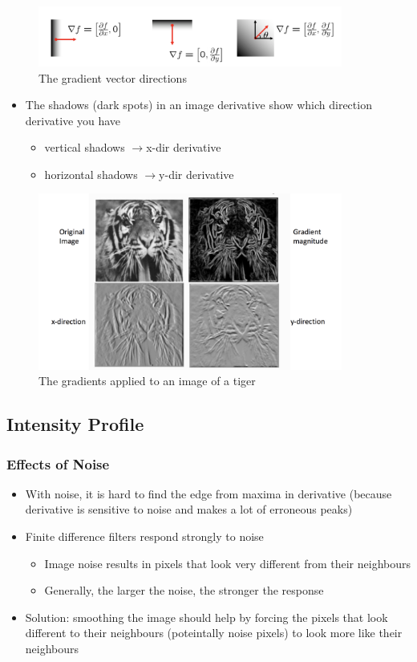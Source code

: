 \documentclass[letterpaper,12pt]{article}
\newcommand{\lra}{\ensuremath{\longrightarrow{}}}
\begin{document}
\begin{figure}[H]
 \centering
 \includegraphics[width=10cm]{images/gradient_direction.png}
 \caption{The gradient vector directions}
\end{figure}

\begin{itemize}
 \item The shadows (dark spots) in an image derivative show which direction derivative you have
       \begin{itemize}
        \item vertical shadows \lra x-dir derivative
        \item horizontal shadows \lra y-dir derivative
       \end{itemize}
\end{itemize}

\begin{figure}[H]
 \centering
 \includegraphics[width=10cm]{images/tiger_gradient.png}
 \caption{The gradients applied to an image of a tiger}
\end{figure}

\subsection{Intensity Profile}
\subsubsection{Effects of Noise}
\begin{itemize}
 \item With noise, it is hard to find the edge from maxima in derivative (because derivative is sensitive to noise and makes a lot of erroneous peaks)
 \item Finite difference filters respond strongly to noise
       \begin{itemize}
        \item Image noise results in pixels that look very different from their neighbours
        \item Generally, the larger the noise, the stronger the response
       \end{itemize}
 \item Solution: smoothing the image should help by forcing the pixels that look different to their neighbours (poteintally noise pixels) to look more like their neighbours
\end{itemize}
\end{document}
